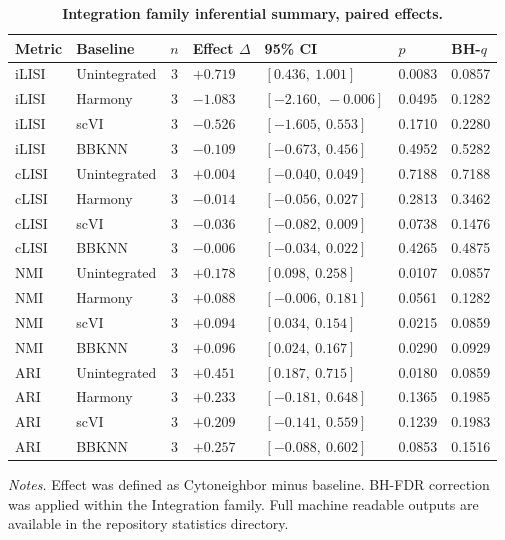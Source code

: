 \documentclass[11pt]{article}
\begin{document}
\begin{table}[htbp]
\centering
\caption{\textbf{Integration family inferential summary, paired effects.}}
\label{tab:s6_integration_effects}
\scriptsize
\begin{tabularx}{\textwidth}{@{}L{0.10\textwidth} L{0.15\textwidth} c L{0.12\textwidth} L{0.20\textwidth} L{0.10\textwidth} Y@{}}
\toprule
\textbf{Metric} & \textbf{Baseline} & \textbf{\(n\)} & \textbf{Effect \(\Delta\)} & \textbf{95\% CI} & \textbf{\(p\)} & \textbf{BH-\(q\)} \\
\midrule
iLISI & Unintegrated & 3 & \(+0.719\) & \([0.436,\ 1.001]\) & 0.0083 & 0.0857 \\
iLISI & Harmony & 3 & \(-1.083\) & \([-2.160,\ -0.006]\) & 0.0495 & 0.1282 \\
iLISI & scVI & 3 & \(-0.526\) & \([-1.605,\ 0.553]\) & 0.1710 & 0.2280 \\
iLISI & BBKNN & 3 & \(-0.109\) & \([-0.673,\ 0.456]\) & 0.4952 & 0.5282 \\
cLISI & Unintegrated & 3 & \(+0.004\) & \([-0.040,\ 0.049]\) & 0.7188 & 0.7188 \\
cLISI & Harmony & 3 & \(-0.014\) & \([-0.056,\ 0.027]\) & 0.2813 & 0.3462 \\
cLISI & scVI & 3 & \(-0.036\) & \([-0.082,\ 0.009]\) & 0.0738 & 0.1476 \\
cLISI & BBKNN & 3 & \(-0.006\) & \([-0.034,\ 0.022]\) & 0.4265 & 0.4875 \\
NMI & Unintegrated & 3 & \(+0.178\) & \([0.098,\ 0.258]\) & 0.0107 & 0.0857 \\
NMI & Harmony & 3 & \(+0.088\) & \([-0.006,\ 0.181]\) & 0.0561 & 0.1282 \\
NMI & scVI & 3 & \(+0.094\) & \([0.034,\ 0.154]\) & 0.0215 & 0.0859 \\
NMI & BBKNN & 3 & \(+0.096\) & \([0.024,\ 0.167]\) & 0.0290 & 0.0929 \\
ARI & Unintegrated & 3 & \(+0.451\) & \([0.187,\ 0.715]\) & 0.0180 & 0.0859 \\
ARI & Harmony & 3 & \(+0.233\) & \([-0.181,\ 0.648]\) & 0.1365 & 0.1985 \\
ARI & scVI & 3 & \(+0.209\) & \([-0.141,\ 0.559]\) & 0.1239 & 0.1983 \\
ARI & BBKNN & 3 & \(+0.257\) & \([-0.088,\ 0.602]\) & 0.0853 & 0.1516 \\
\bottomrule
\end{tabularx}

\vspace{0.5em}
{\raggedright\scriptsize\textit{Notes.} Effect was defined as Cytoneighbor minus baseline. BH-FDR correction was applied within the Integration family. Full machine readable outputs are available in the repository statistics directory.\par}
\end{table}
\end{document}
